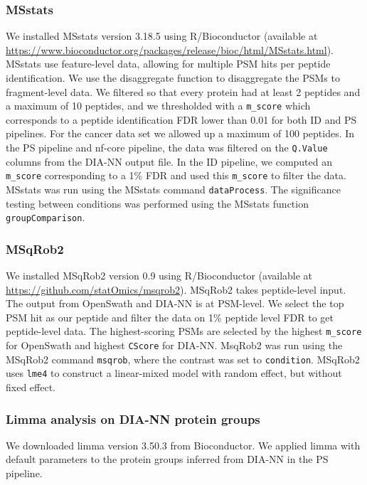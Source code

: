 \documentclass[10pt,letterpaper]{article}
\begin{document}
\subsubsection*{MSstats}

We installed MSstats version 3.18.5 using R/Bioconductor (available at \url{https://www.bioconductor.org/packages/release/bioc/html/MSstats.html}). MSstats use feature-level data, allowing for multiple PSM hits per peptide identification. We use the disaggregate function to disaggregate the PSMs to fragment-level data. We filtered so that every protein had at least 2 peptides and a maximum of 10 peptides, and we thresholded with a \texttt{m\_score} which corresponds to a peptide identification FDR lower than 0.01 for both ID and PS pipelines. For the cancer data set we allowed up a maximum of 100 peptides. In the PS pipeline and nf-core pipeline, the data was filtered on the \texttt{Q.Value} columns from the DIA-NN output file. In the ID pipeline, we computed an \texttt{m\_score} corresponding to a 1\% FDR and used this \texttt{m\_score} to filter the data. MSstats was run using the MSstats command \texttt{dataProcess}. The significance testing between conditions was performed using the MSstats function \texttt{groupComparison}.  

\subsubsection*{MSqRob2}

We installed MSqRob2 version 0.9 using R/Bioconductor (available at \url{https://github.com/statOmics/msqrob2}). MSqRob2 takes peptide-level input. The output from OpenSwath and DIA-NN is at PSM-level. We select the top PSM hit as our peptide and filter the data on 1\% peptide level FDR to get peptide-level data. The highest-scoring PSMs are selected by the highest \texttt{m\_score} for OpenSwath and highest \texttt{CScore} for DIA-NN. MsqRob2 was run using the MSqRob2 command \texttt{msqrob}, where the contrast was set to \texttt{condition}.
MSqRob2 uses \texttt{lme4} to construct a linear-mixed model with random effect, but without fixed effect. 

\subsubsection*{Limma analysis on DIA-NN protein groups}

We downloaded limma\cite{limma} version 3.50.3 from Bioconductor. We applied limma with default parameters to the protein groups inferred from DIA-NN in the PS pipeline.  
\end{document}
